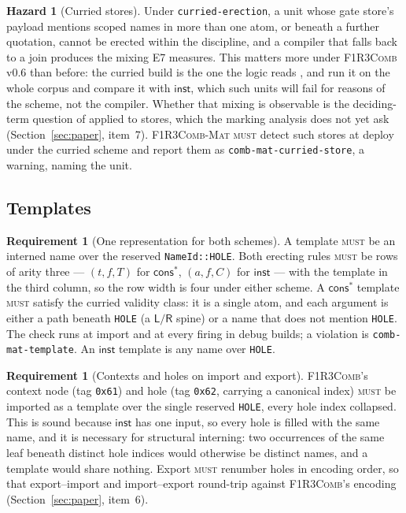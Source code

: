 \documentclass[11pt,a4paper]{article}
\newcommand{\code}[1]{\texttt{#1}}
\newcommand{\Comb}{\textsc{F1R3Comb}}
\newcommand{\Mat}{\textsc{F1R3Comb-Mat}}
\newcommand{\MUST}{\textsc{must}}
\theoremstyle{definition}
\newtheorem{requirement}[definition]{Requirement}
\newtheorem{hazard}[definition]{Hazard}
\theoremstyle{plain}
\newcommand{\Lft}{\mathsf{L}}
\newcommand{\Rgt}{\mathsf{R}}
\newcommand{\inst}{\mathsf{inst}}
\newcommand{\cstar}{\mathsf{cons}^{*}}
\begin{document}
\begin{hazard}[Curried stores]\label{haz:curriedstores}
Under \code{curried-erection}, a unit whose gate store's payload mentions
scoped names in more than one atom, or beneath a further quotation, cannot be
erected within the discipline, and a compiler that falls back to a join
produces the mixing E7 measures. This matters more under \Comb{} v0.6 than
before: the curried build is the one the logic reads
\cite[Req.~5.27]{combspec}, and \cite[Obl.~11.5, Obl.~11.6]{combspec} run it
on the whole corpus and compare it with $\inst$, which such units will fail
for reasons of the scheme, not the compiler. Whether that mixing is observable is the deciding-term
question of \cite[Ex.~6.21]{draft3} applied to stores, which the marking
analysis does not yet ask (Section~\ref{sec:paper}, item~7). \Mat{} \MUST{}
detect such stores at deploy under the curried scheme and report them as
\code{comb-mat-curried-store}, a warning, naming the unit.
\end{hazard}

\subsection{Templates}

\begin{requirement}[One representation for both schemes]\label{req:template}
A template \MUST{} be an interned name over the reserved \code{NameId::HOLE}.
Both erecting rules \MUST{} be rows of arity three --- $(t,f,T)$ for $\cstar$,
$(a,f,C)$ for $\inst$ --- with the template in the third column, so the row
width is four under either scheme. A $\cstar$ template \MUST{} satisfy the
curried validity class: it is a single atom, and each argument is either a
path beneath \code{HOLE} (a $\Lft/\Rgt$ spine) or a name that does not mention
\code{HOLE}. The check runs at import and at every firing in debug builds;
a violation is \code{comb-mat-template}. An $\inst$ template is any name over
\code{HOLE}.
\end{requirement}

\begin{requirement}[Contexts and holes on import and export]\label{req:holeidx}
\Comb's context node (tag \code{0x61}) and hole (tag \code{0x62}, carrying a
canonical index) \cite[Req.~4.11, Req.~5.24]{combspec} \MUST{} be imported as
a template over the single reserved \code{HOLE}, every hole index collapsed.
This is sound because $\inst$ has one input, so every hole is filled with the
same name, and it is necessary for structural interning: two occurrences of
the same leaf beneath distinct hole indices would otherwise be distinct names,
and a template would share nothing. Export \MUST{} renumber holes in encoding
order, so that export--import and import--export round-trip against \Comb's
encoding (Section~\ref{sec:paper}, item~6).
\end{requirement}
\end{document}
